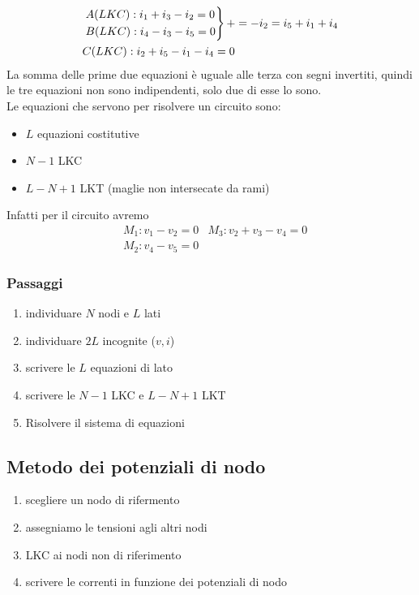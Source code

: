 \documentclass{article}
\begin{document}
\begin{align*}
    &\begin{rcases}
        A(LKC): i_1+i_3-i_2=0\\
        B(LKC): i_4-i_3-i_5=0
    \end{rcases}+ = -i_2 =i_5+i_1+i_4\\
    &C(LKC): i_2+i_5-i_1-i_4=0
\end{align*}
La somma delle prime due equazioni è uguale alle terza con segni invertiti, quindi le tre equazioni non sono indipendenti, solo due di esse lo sono.
\vspace*{0.1cm}\\
Le equazioni che servono per risolvere un circuito sono:
\begin{itemize}
    \item $L$ equazioni costitutive
    \item $N-1$ LKC
    \item $L-N+1$ LKT (maglie non intersecate da rami)
\end{itemize}
Infatti per il circuito avremo
\begin{align*}
    &M_1: v_1-v_2 = 0 & M_3: v_2+v_3 - v_4=0\\
    &M_2: v_4-v_5=0
\end{align*}

\subsubsection*{Passaggi}
\begin{enumerate}
    \item individuare $N$ nodi e $L$ lati
    \item individuare $2L$ incognite ($v,i$)
    \item scrivere le $L$ equazioni di lato
    \item scrivere le $N-1$ LKC e $L-N+1$ LKT
    \item Risolvere il sistema di equazioni
\end{enumerate}




\subsection{Metodo dei potenziali di nodo}
\begin{enumerate}
    \item scegliere un nodo di rifermento
    \item assegniamo le tensioni agli altri nodi
    \item LKC ai nodi non di riferimento
    \item scrivere le correnti in funzione dei potenziali di nodo
\end{enumerate}
\end{document}
